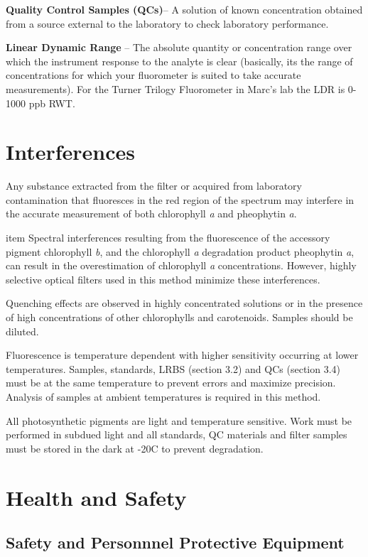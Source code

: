 \documentclass[12pt]{../SOP3}\usepackage[]{graphicx}\usepackage[]{color}
\begin{document}
\NP \textbf{Quality Control Samples (QCs)}-- A solution of known concentration obtained from a source external to the laboratory to check laboratory performance.

\NP \textbf{Linear Dynamic Range} -- The absolute quantity or concentration range over which the instrument response to the analyte is clear (basically, its the range of concentrations for which your fluorometer is suited to take accurate measurements). For the Turner Trilogy Fluorometer in Marc's lab the LDR is 0-1000 ppb RWT. 


\section{Interferences}
\NP Any substance extracted from the filter or acquired from laboratory contamination that fluoresces in the red region of the spectrum may interfere in the accurate measurement of both chlorophyll \textit{a} and pheophytin \textit{a}.

\NP item Spectral interferences resulting from the fluorescence of the accessory pigment chlorophyll \textit{b}, and the chlorophyll \textit{a} degradation product pheophytin \textit{a}, can result in the overestimation of chlorophyll \textit{a} concentrations. However, highly selective optical filters used in this method minimize these interferences.

\NP Quenching effects are observed in highly concentrated solutions or in the presence of high concentrations of other chlorophylls and carotenoids. Samples should be diluted.

\NP Fluorescence is temperature dependent with higher sensitivity occurring at lower temperatures. Samples, standards, LRBS (section 3.2) and QCs (section 3.4) must be at the same temperature to prevent errors and maximize precision. Analysis of samples at ambient temperatures is required in this method.

\NP All photosynthetic pigments are light and temperature sensitive. Work must be performed in subdued light and all standards, QC materials and filter samples must be stored in the dark at -20\degree C to prevent degradation.

\section{Health and Safety}

\subsection*{Safety and Personnnel Protective Equipment}
\end{document}
